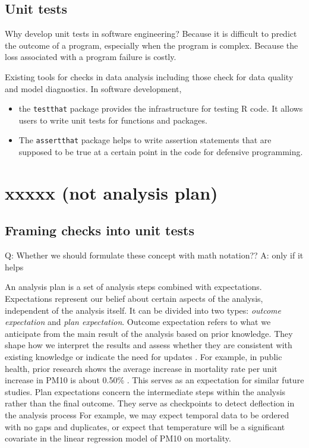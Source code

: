 \documentclass[
]{jds}
\providecommand{\tightlist}{%
  \setlength{\itemsep}{0pt}\setlength{\parskip}{0pt}}\usepackage{longtable,booktabs,array}
\begin{document}
\subsection{Unit tests}\label{unit-tests}

Why develop unit tests in software engineering? Because it is difficult
to predict the outcome of a program, especially when the program is
complex. Because the loss associated with a program failure is costly.

Existing tools for checks in data analysis including those check for
data quality and model diagnostics. In software development,

\begin{itemize}
\tightlist
\item
  the \texttt{testthat} package \citep{testthat} provides the
  infrastructure for testing R code. It allows users to write unit tests
  for functions and packages.
\item
  The \texttt{assertthat} package \citep{assertthat} helps to write
  assertion statements that are supposed to be true at a certain point
  in the code for defensive programming.
\end{itemize}

\section{xxxxx (not analysis plan)}\label{sec-plan}

\subsection{Framing checks into unit
tests}\label{framing-checks-into-unit-tests}

Q: Whether we should formulate these concept with math notation?? A:
only if it helps

An analysis plan is a set of analysis steps combined with expectations.
Expectations represent our belief about certain aspects of the analysis,
independent of the analysis itself. It can be divided into two types:
\emph{outcome expectation} and \emph{plan expectation}. Outcome
expectation refers to what we anticipate from the main result of the
analysis based on prior knowledge. They shape how we interpret the
results and assess whether they are consistent with existing knowledge
or indicate the need for updates \citep{grolemund_cognitive_2014}. For
example, in public health, prior research shows the average increase in
mortality rate per unit increase in PM10 is about 0.50\%
\citep{liu2019ambient}. This serves as an expectation for similar future
studies. Plan expectations concern the intermediate steps within the
analysis rather than the final outcome. They serve as checkpoints to
detect deflection in the analysis process For example, we may expect
temporal data to be ordered with no gaps and duplicates, or expect that
temperature will be a significant covariate in the linear regression
model of PM10 on mortality.
\end{document}
